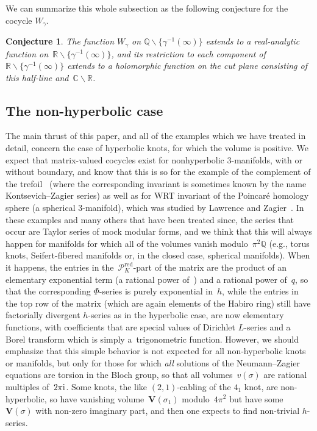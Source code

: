 \documentclass[pdftex]{sigma}
\numberwithin{equation}{section}
\newtheorem{Conjecture}[Theorem]{Conjecture}
\def\BQ{\mathbb Q}
\def\BR{\mathbb R}
\def\BC{\mathbb C}
\def\calP{\mathcal P}
\def\calP{\mathcal P}
\def\Q{\mathbb Q}
\def\i{^{-1}}
\def\s{\sigma}
\def\V{\mathbf V}
\def\ssm{\smallsetminus}
\def\g{\gamma}
\def\RED{^{\text{red}}}
\begin{document}
We can summarize this whole subsection as the following conjecture for the cocycle $W_\g$.

\begin{Conjecture}
\label{conj.Wanalytic}
The function $W_\g$ on $\BQ\ssm\big\{\g\i(\infty)\big\}$ extends to a real-analytic function on~$\BR\ssm\big\{\g\i(\infty)\big\}$, and its restriction to each component of
$\BR\ssm\big\{\g\i(\infty)\big\}$ extends to a holomorphic function on the cut plane consisting
of this half-line and~$\BC\ssm\BR$.
\end{Conjecture}


\subsection{The non-hyperbolic case}
The main thrust of this paper, and all of the examples which we have treated in detail,
concern the case of hyperbolic knots, for which the volume is positive. We expect that
matrix-valued cocycles exist for nonhyperbolic 3-manifolds, with or without boundary,
and know that this is so for the example of the complement of the trefoil~\cite{Za:strange}
(where the corresponding invariant is sometimes known by the name Kontsevich--Zagier series)
as well as for WRT invariant of the Poincar\'e homology sphere (a spherical 3-manifold),
which was studied by Lawrence and Zagier~\cite{LZ}. In these examples and many
others that have been treated since, the series that occur are Taylor series of mock modular
forms, and we think that this will always happen for manifolds for which all of the volumes
vanish modulo~$\pi^2\Q$ (e.g., torus knots, Seifert-fibered manifolds or, in the closed case, spherical
manifolds). When it happens, the entries in the~$\calP\RED_K$-part of the matrix are the product of
an elementary exponential term \big(a rational power of~\big) and a rational power of~$q$,
so that the corresponding $\Phi$-series is purely exponential in~$h$, while the entries in the top row
of the matrix (which are again elements of the Habiro ring) still have factorially divergent
$h$-series as in the hyperbolic case, are now elementary functions, with coefficients that
are special values of Dirichlet $L$-series and a Borel transform which is simply a~trigonometric
function. However, we should emphasize that this simple behavior is not expected for all
non-hyperbolic knots or manifolds, but only for those for which {\it all} solutions
of the Neumann--Zagier equations are torsion in the Bloch group, so that all volumes~$v(\s)$
are rational multiples of~$2\pi {\rm i}$. Some knots, the like $(2,1)$-cabling of the $4_1$ knot,
are non-hyperbolic, so have vanishing volume~$\V(\s_1)$ modulo~$4\pi^2$ but have some
$\V(\s)$ with non-zero imaginary part, and then one expects to find non-trivial $h$-series.
\end{document}
